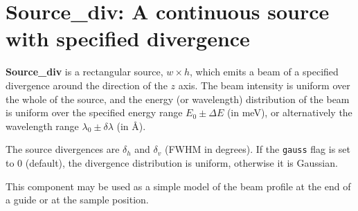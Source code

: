 \section{Source\_div: A continuous source with specified divergence}
\label{source-div}


{\bf Source\_div} is a rectangular source, $w \times h$, which emits a
beam of a specified divergence around the direction of the $z$ axis.
The beam intensity is uniform over
the whole of the source, and the energy (or wavelength) distribution
of the beam is uniform over the specified energy range
$E_0 \pm \Delta E$ (in meV), or alternatively
the wavelength range $\lambda_0 \pm \delta\lambda$ (in \AA ).

The source divergences are $\delta_h$ and $\delta_v$ (FWHM in degrees).
If the \verb+gauss+ flag is set to 0 (default),
the divergence distribution is uniform, otherwise it is Gaussian.

This component may be used as a simple model of the
beam profile at the end of a guide or at the sample position.

